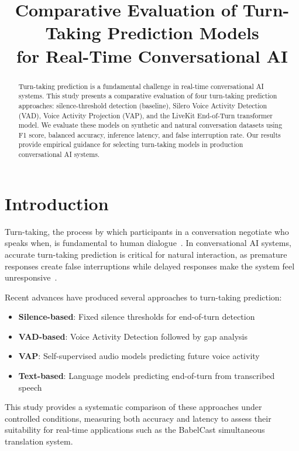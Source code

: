 \documentclass[conference]{IEEEtran}
\title{Comparative Evaluation of Turn-Taking Prediction Models\\for Real-Time Conversational AI}
\author{
\IEEEauthorblockN{BabelCast Research}
}
\begin{document}
\maketitle

\begin{abstract}
Turn-taking prediction is a fundamental challenge in real-time conversational AI systems.
This study presents a comparative evaluation of four turn-taking prediction approaches:
silence-threshold detection (baseline), Silero Voice Activity Detection (VAD),
Voice Activity Projection (VAP), and the LiveKit End-of-Turn transformer model.
We evaluate these models on synthetic and natural conversation datasets using
F1 score, balanced accuracy, inference latency, and false interruption rate.
Our results provide empirical guidance for selecting turn-taking models
in production conversational AI systems.
\end{abstract}

\section{Introduction}

Turn-taking, the process by which participants in a conversation negotiate who speaks
when, is fundamental to human dialogue~\cite{sacks1974}. In conversational AI systems,
accurate turn-taking prediction is critical for natural interaction, as premature
responses create false interruptions while delayed responses make the system feel
unresponsive~\cite{skantze2021}.

Recent advances have produced several approaches to turn-taking prediction:
\begin{itemize}
    \item \textbf{Silence-based}: Fixed silence thresholds for end-of-turn detection~\cite{raux2009}
    \item \textbf{VAD-based}: Voice Activity Detection followed by gap analysis
    \item \textbf{VAP}: Self-supervised audio models predicting future voice activity~\cite{ekstedt2024vap}
    \item \textbf{Text-based}: Language models predicting end-of-turn from transcribed speech~\cite{livekit2025}
\end{itemize}

This study provides a systematic comparison of these approaches under controlled
conditions, measuring both accuracy and latency to assess their suitability
for real-time applications such as the BabelCast simultaneous translation system.
\end{document}
